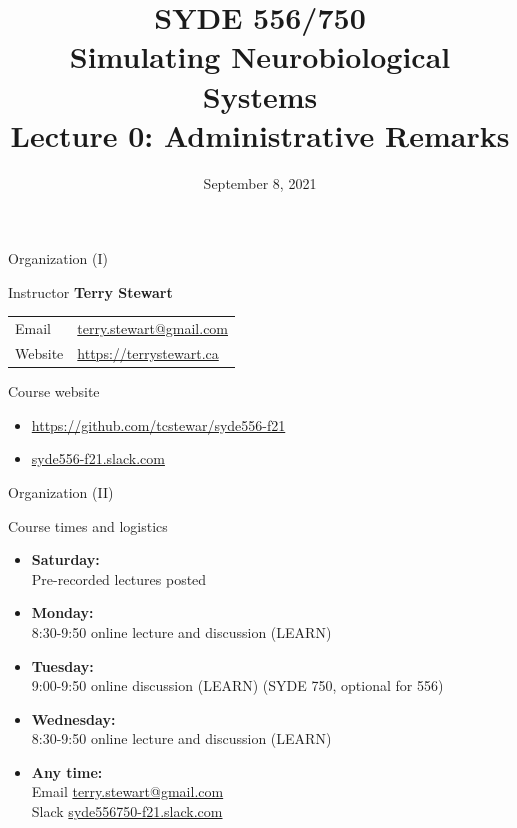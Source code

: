 \documentclass[aspectratio=169]{beamer}
\date{September 8, 2021}
\title{SYDE 556/750 \\ Simulating Neurobiological Systems \\ Lecture 0: Administrative Remarks}
\begin{document}
	
\begin{frame}{}
	\MakeTitle
\end{frame}

\begin{frame}{Organization (I)}
	\begin{block}{Instructor}
		\vspace{2mm}
		\textbf{Terry Stewart}\\[2mm]
		\hspace{-2.5mm}\begin{tabular}{l l}
			Email & \url{terry.stewart@gmail.com}\\
			Website & \url{https://terrystewart.ca}\\
		\end{tabular}
	\end{block}
 
	\vfill

	\begin{block}{Course website}
		\begin{itemize}
			\item \url{https://github.com/tcstewar/syde556-f21}
			\item \url{syde556-f21.slack.com}
		\end{itemize}
	\end{block}
\end{frame}

\begin{frame}{Organization (II)}
	\begin{block}{Course times and logistics}
		\begin{itemize}
			\item \textbf{Saturday:}\\
			Pre-recorded lectures posted
			\item \textbf{Monday:}\\
			8:30-9:50 online lecture and discussion (LEARN)
			\item \textbf{Tuesday:}\\9:00-9:50 online discussion (LEARN) (SYDE 750, optional for 556)
			\item \textbf{Wednesday:}\\
			8:30-9:50 online lecture and discussion (LEARN) 
			\item \textbf{Any time:}\\
Email \url{terry.stewart@gmail.com}\\ Slack \url{syde556750-f21.slack.com} 
		\end{itemize}
	\end{block}

\end{frame}
\end{document}
